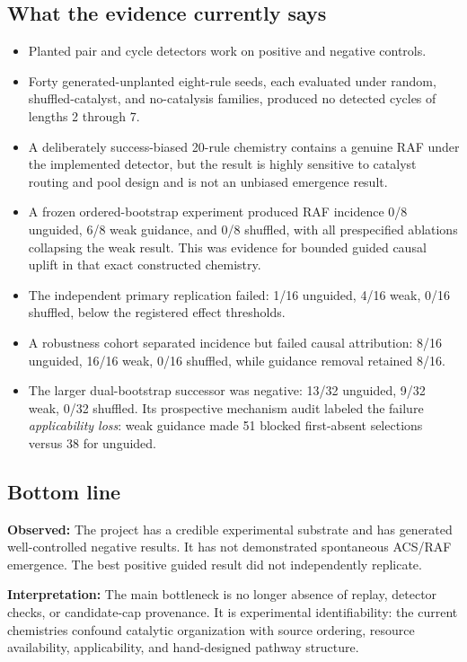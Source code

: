 \documentclass[11pt]{article}
\newcommand{\obs}{\textbf{Observed: }}
\newcommand{\interp}{\textbf{Interpretation: }}
\begin{document}
\subsection{What the evidence currently says}

\begin{itemize}
\item Planted pair and cycle detectors work on positive and negative controls.
\item Forty generated-unplanted eight-rule seeds, each evaluated under random,
  shuffled-catalyst, and no-catalysis families, produced no detected cycles of
  lengths 2 through 7.
\item A deliberately success-biased 20-rule chemistry contains a genuine RAF
  under the implemented detector, but the result is highly sensitive to
  catalyst routing and pool design and is not an unbiased emergence result.
\item A frozen ordered-bootstrap experiment produced RAF incidence
  0/8 unguided, 6/8 weak guidance, and 0/8 shuffled, with all prespecified
  ablations collapsing the weak result.  This was evidence for bounded guided
  causal uplift in that exact constructed chemistry.
\item The independent primary replication failed: 1/16 unguided, 4/16 weak,
  0/16 shuffled, below the registered effect thresholds.
\item A robustness cohort separated incidence but failed causal attribution:
  8/16 unguided, 16/16 weak, 0/16 shuffled, while guidance removal retained
  8/16.
\item The larger dual-bootstrap successor was negative:
  13/32 unguided, 9/32 weak, 0/32 shuffled.  Its prospective mechanism audit
  labeled the failure \emph{applicability loss}: weak guidance made 51 blocked
  first-absent selections versus 38 for unguided.
\end{itemize}

\subsection{Bottom line}

\obs The project has a credible experimental substrate and has generated
well-controlled negative results.  It has not demonstrated spontaneous ACS/RAF
emergence.  The best positive guided result did not independently replicate.

\interp The main bottleneck is no longer absence of replay, detector checks, or
candidate-cap provenance.  It is experimental identifiability: the current
chemistries confound catalytic organization with source ordering, resource
availability, applicability, and hand-designed pathway structure.
\end{document}
